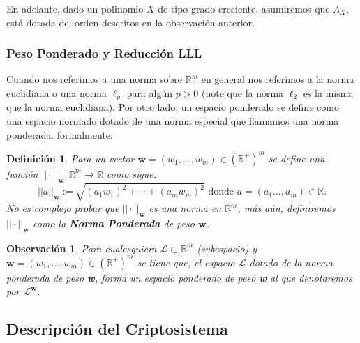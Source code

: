 \documentclass[11pt]{article}
\newcommand{\R}{\mathbb{R}}
\numberwithin{equation}{section} %
\numberwithin{figure}{section} %
\numberwithin{table}{section} %
\newtheorem{defi}{{\bf Definici\'on }}[subsection]
\newtheorem{obs}{{\bf Observaci\'on }}[subsection]
\begin{document}
				En adelante, dado un polinomio $X$ de tipo grado creciente, asumiremos que $\Lambda_X$, est\'a dotada del orden descritos en la observaci\'on anterior.	
	
			\subsubsection{Peso Ponderado y Reducci\'on LLL}
			\label{522MPre}

				Cuando nos referimos a una norma sobre $\R^m$ en general nos referimos a la norma euclidiana o una norma $\ell_p$ para alg\'un $p> 0$ (note que la norma $\ell_2$ es la misma que la norma euclidiana). Por otro lado, un espacio ponderado se define como una espacio normado dotado de una norma especial que llamamos una norma ponderada. formalmente:
						\begin{defi}
							Para un vector $\mathbf{w}=(w_1,\ldots,w_m)\in(\R^+)^m$ se define una funci\'on $||\cdot||_\mathbf{w}:\R^m\rightarrow \R$ como sigue:
							$$
								||a||_\mathbf{w}:=\sqrt{(a_1w_1)^2+\cdots+(a_mw_m)^2}\text{ donde } a=(a_1\ldots,a_m)\in\R.
							$$
							No es complejo probar que $||\cdot||_\mathbf{w}$ es una norma en $\R^m$, m\'as a\'un, definiremos $||\cdot||_\mathbf{w}$ como la \textbf{Norma Ponderada} de peso $\mathbf{w}$.
						\end{defi}
		
						\begin{obs}
							Para cualesquiera $\mathcal{L}\subset \R^m$ (subespacio) y $\mathbf{w}=(w_1,\ldots,w_m)\in(\R^+)^m$ se tiene que, el espacio $\mathcal{L}$ dotado de la norma ponderada de peso \textbf{w}, forma un espacio ponderado de peso \textbf{w} al que denotaremos por $\mathcal{L}^\mathbf{w}$. 
						\end{obs}
			

		\subsection{Descripci\'on del Criptosistema}
		\label{53cripDiof}
\end{document}
